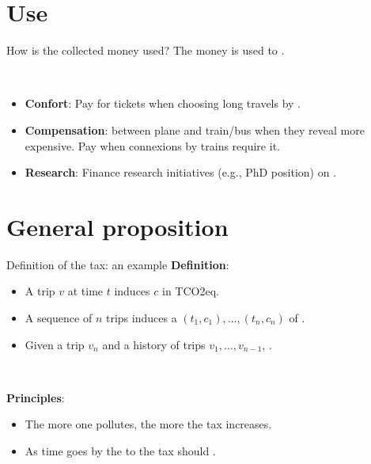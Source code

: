 \documentclass[french, english]{beamer}
\begin{document}
\section{Use}
\begin{frame}{How is the collected money used?}
The money is used to .

\

\begin{itemize} 
    \item \textbf{Confort}: Pay for  tickets when choosing long travels by . 
    \item \textbf{Compensation}:  between plane and train/bus when they reveal more expensive.  Pay  when connexions by trains require it.
    \item \textbf{Research}: Finance research initiatives (e.g., PhD position) on .
\end{itemize}	
\end{frame}

\section{General proposition}
\begin{frame}{Definition of the tax: an example}
\textbf{Definition}:
\begin{itemize}
\item A trip $v$ at time $t$ induces  $c$ in TCO2eq.
\item A sequence of $n$ trips induces a  $(t_1, c_1),\ldots,(t_n,c_n)$ of .
\item Given a trip $v_n$ and a history of trips $v_1,\ldots, v_{n-1}$, .  
\end{itemize}

\

\textbf{Principles}:
\begin{itemize}
\item The more one pollutes, the more the tax increases. 
\item As time goes by the  to the tax should .
\end{itemize}
\end{frame}
\end{document}
